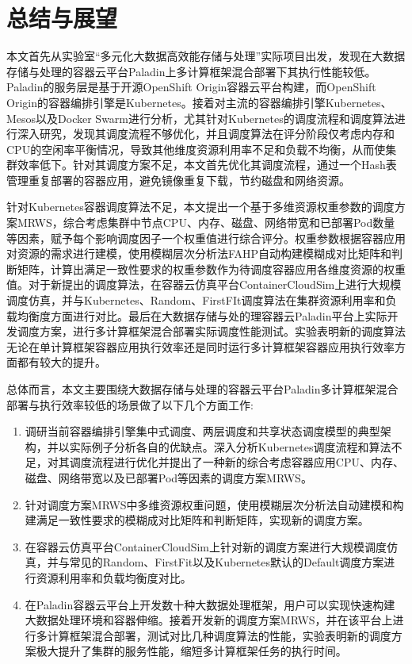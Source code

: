 \chapter{总结与展望}
本文首先从实验室“多元化大数据高效能存储与处理”实际项目出发，发现在大数据存储与处理的容器云平台Paladin上多计算框架混合部署下其执行性能较低。Paladin的服务层是基于开源OpenShift Origin容器云平台构建，而OpenShift Origin的容器编排引擎是Kubernetes。接着对主流的容器编排引擎Kubernetes、Mesos以及Docker Swarm进行分析，尤其针对Kubernetes的调度流程和调度算法进行深入研究，发现其调度流程不够优化，并且调度算法在评分阶段仅考虑内存和CPU的空闲率平衡情况，导致其他维度资源利用率不足和负载不均衡，从而使集群效率低下。针对其调度方案不足，本文首先优化其调度流程，通过一个Hash表管理重复部署的容器应用，避免镜像重复下载，节约磁盘和网络资源。

针对Kubernetes容器调度算法不足，本文提出一个基于多维资源权重参数的调度方案MRWS，综合考虑集群中节点CPU、内存、磁盘、网络带宽和已部署Pod数量等因素，赋予每个影响调度因子一个权重值进行综合评分。权重参数根据容器应用对资源的需求进行建模，使用模糊层次分析法FAHP自动构建模糊成对比矩阵和判断矩阵，计算出满足一致性要求的权重参数作为待调度容器应用各维度资源的权重值。对于新提出的调度算法，在容器云仿真平台ContainerCloudSim上进行大规模调度仿真，并与Kubernetes、Random、FirstFIt调度算法在集群资源利用率和负载均衡度方面进行对比。最后在大数据存储与处的理容器云Paladin平台上实际开发调度方案，进行多计算框架混合部署实际调度性能测试。实验表明新的调度算法无论在单计算框架容器应用执行效率还是同时运行多计算框架容器应用执行效率方面都有较大的提升。

总体而言，本文主要围绕大数据存储与处理的容器云平台Paladin多计算框架混合部署与执行效率较低的场景做了以下几个方面工作:
\begin{enumerate}[(1)]
	\item 调研当前容器编排引擎集中式调度、两层调度和共享状态调度模型的典型架构，并以实际例子分析各自的优缺点。深入分析Kubernetes调度流程和算法不足，对其调度流程进行优化并提出了一种新的综合考虑容器应用CPU、内存、磁盘、网络带宽以及已部署Pod等因素的调度方案MRWS。
	\item 针对调度方案MRWS中多维资源权重问题，使用模糊层次分析法自动建模和构建满足一致性要求的模糊成对比矩阵和判断矩阵，实现新的调度方案。
	\item 在容器云仿真平台ContainerCloudSim上针对新的调度方案进行大规模调度仿真，并与常见的Random、FirstFit以及Kubernetes默认的Default调度方案进行资源利用率和负载均衡度对比。
	\item 在Paladin容器云平台上开发数十种大数据处理框架，用户可以实现快速构建大数据处理环境和容器伸缩。接着开发新的调度方案MRWS，并在该平台上进行多计算框架混合部署，测试对比几种调度算法的性能，实验表明新的调度方案极大提升了集群的服务性能，缩短多计算框架任务的执行时间。
\end{enumerate}

